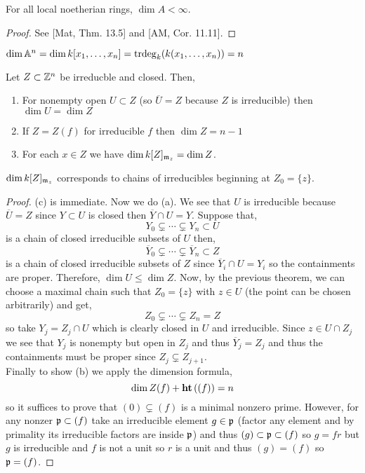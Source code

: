 \documentclass[12pt]{article}
\begin{document}
\begin{theorem}[Krull]
For all local noetherian rings, $\dim{A} < \infty$.
\end{theorem}

\begin{proof}
See [Mat, Thm. 13.5] and [AM, Cor. 11.11].
\end{proof}

\begin{cor}
$\dim{\mathbb{A}^n} = \dim{k[x_1, \dots, x_n]} = \mathrm{trdeg}_{k}(k(x_1, \dots, x_n)) = n$
\end{cor}

\begin{cor}
Let $Z \subset \mathbb{Z}^n$ be irreducble and closed. Then,
\begin{enumerate}
\item For nonempty open $U \subset Z$ (so $\overline{U} = Z$ because $Z$ is irreducible) then $\dim{U} = \dim{Z}$
\item If $Z = Z(f)$ for irreducible $f$ then $\dim{Z} = n - 1$
\item For each $x \in Z$ we have $\dim{k[Z]_{\mathfrak{m}_z}} = \dim{Z}$.
\end{enumerate}
\end{cor}

\begin{rmk}
$\dim{k[Z]_{\mathfrak{m}_z}}$ corresponds to chains of irreducibles beginning at $Z_0 = \{ z \}$.
\end{rmk}

\begin{proof}
(c) is immediate. Now we do (a). We see that $U$ is irreducible because $\overline{U} = Z$ since $Y \subset U$ is closed then $\overline{Y} \cap U = Y$. Suppose that,
\[ Y_0 \subsetneq \cdots \subsetneq Y_n \subset U \]
is a chain of closed irreducible subsets of $U$ then,
\[ \overline{Y}_0 \subsetneq \cdots \subsetneq \overline{Y}_n \subset Z \]
is a chain of closed irreducible subsets of $Z$ since $\overline{Y}_i \cap U = Y_i$ so the containments are proper. Therefore, $\dim{U} \le \dim{Z}$. Now, by the previous theorem, we can choose a maximal chain such that $Z_0 = \{ z \}$ with $z \in U$ (the point can be chosen arbitrarily) and get,
\[ Z_0 \subsetneq \cdots \subsetneq Z_n = Z \]
so take $Y_j = Z_j \cap U$ which is clearly closed in $U$ and irreducible. Since $z \in U \cap Z_j$ we see that $Y_j$ is nonempty but open in $Z_j$ and thus $\overline{Y}_j = Z_j$ and thus the containments must be proper since $Z_j \subsetneq Z_{j+1}$. 
\bigskip\\
Finally to show (b) we apply the dimension formula,
\[ \dim{Z(f)} + \mathbf{ht}\left( (f) \right) = n \]
so it suffices to prove that $(0) \subsetneq (f)$ is a minimal nonzero prime. However, for any nonzer $\mathfrak{p} \subset (f)$ take an irreducible element $g \in \mathfrak{p}$ (factor any element and by primality its irreducible factors are inside $\mathfrak{p}$) and thus $(g) \subset \mathfrak{p} \subset (f)$ so $g = fr$ but $g$ is irreducible and $f$ is not a unit so $r$ is a unit and thus $(g) = (f)$ so $\mathfrak{p} = (f)$.
\end{proof}
\end{document}
